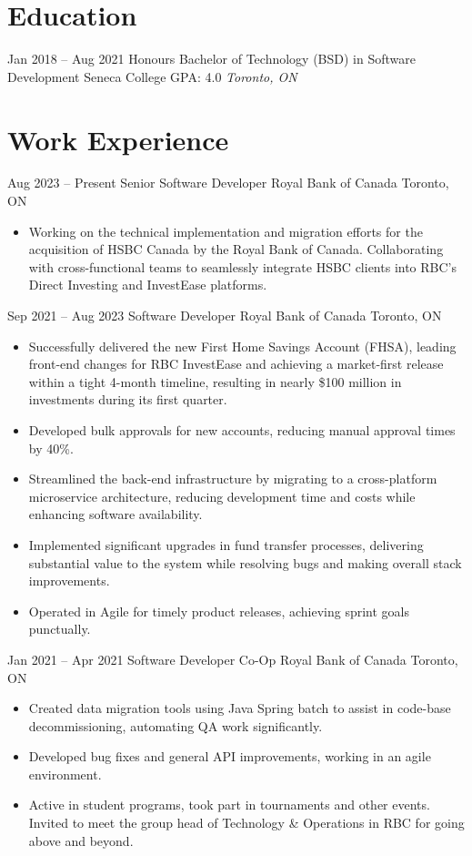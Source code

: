 \documentclass[letterpaper]{moderncv}
\begin{document}
\makecvtitle
    

\section{Education}
\cventry
{Jan 2018 -- Aug 2021}
{Honours Bachelor of Technology (BSD) in Software Development}
{Seneca College}
{GPA: 4.0}
{\textit{Toronto, ON}}
{}
\section{Work Experience}
\cventry
{Aug 2023 -- Present}
{Senior Software Developer}
{Royal Bank of Canada}
{Toronto, ON}
{}
{\begin{itemize}%
	\item Working on the technical implementation and migration efforts for the acquisition of HSBC Canada by the Royal Bank of Canada. Collaborating with cross-functional teams to seamlessly integrate HSBC clients into RBC's Direct Investing and InvestEase platforms.
	\end{itemize}}
\cventry
{Sep 2021 -- Aug 2023}
{Software Developer}
{Royal Bank of Canada}
{Toronto, ON}
{}
{\begin{itemize}%
	\item Successfully delivered the new First Home Savings Account (FHSA), leading front-end changes for RBC InvestEase and achieving a market-first release within a tight 4-month timeline, resulting in nearly \$100 million in investments during its first quarter.
	\item Developed bulk approvals for new accounts, reducing manual approval times by 40\%.
	\item Streamlined the back-end infrastructure by migrating to a cross-platform microservice architecture, reducing development time and costs while enhancing software availability.
	\item Implemented significant upgrades in fund transfer processes, delivering substantial value to the system while resolving bugs and making overall stack improvements.
	\item Operated in Agile for timely product releases, achieving sprint goals punctually.
	\end{itemize}}
\cventry
{Jan 2021 -- Apr 2021}
{Software Developer Co-Op}
{Royal Bank of Canada}
{Toronto, ON}
{}
{\begin{itemize}%
	\item Created data migration tools using Java Spring batch to assist in code-base decommissioning, automating QA work significantly.
	\item Developed bug fixes and general API improvements, working in an agile environment.
	\item Active in student programs, took part in tournaments and other events. Invited to meet the group head of Technology \& Operations in RBC for going above and beyond.
	\end{itemize}}
\end{document}
